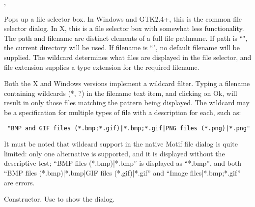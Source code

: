
, 


Pops up a file selector box. In Windows and GTK2.4+, this is the common
file selector dialog. In X, this is a file selector box with somewhat less
functionality. The path and filename are distinct elements of a full file pathname.
If path is ``", the current directory will be used. If filename is ``",
no default filename will be supplied. The wildcard determines what files
are displayed in the file selector, and file extension supplies a type
extension for the required filename.

Both the X and Windows versions implement a wildcard filter. Typing a
filename containing wildcards (*, ?) in the filename text item, and
clicking on Ok, will result in only those files matching the pattern being
displayed. The wildcard may be a specification for multiple
types of file with a description for each, such as:

\begin{verbatim}
 "BMP and GIF files (*.bmp;*.gif)|*.bmp;*.gif|PNG files (*.png)|*.png"
\end{verbatim}

It must be noted that wildcard support in the native Motif file
dialog is quite limited: only one alternative is supported,
and it is displayed without the descriptive test; ``BMP files (*.bmp)|*.bmp''
is displayed as ``*.bmp'', and both
``BMP files (*.bmp)|*.bmp|GIF files (*.gif)|*.gif'' and
``Image files|*.bmp;*.gif'' are errors.


\label{wxfiledialogctor}


Constructor. Use  to show the dialog.


